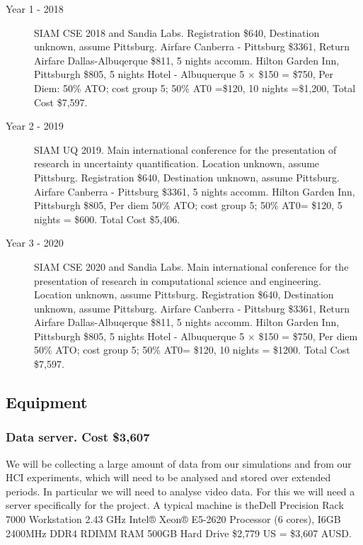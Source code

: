 \documentclass[a4paper,twoside,12pt,compact]{article}
\begin{document}
\begin{description}
\item[Year 1 - 2018] SIAM CSE 2018 and Sandia Labs.
Registration \$640, 
Destination unknown, assume Pittsburg.
Airfare Canberra - Pittsburg \$3361,
Return Airfare Dallas-Albuqerque \$811,
5 nights accomm. Hilton Garden Inn, Pittsburgh \$805,  
5 nights Hotel - Albuquerque 5 $\times$  \$150 = \$750,
Per Diem: 50\% ATO; cost group 5; 50\% AT0 =\$120, 10 nights =\$1,200, 
Total Cost \$7,597.

\item[Year 2 - 2019] SIAM UQ 2019.
Main international conference for the presentation of research in uncertainty quantification. Location unknown, assume Pittsburg.
Registration \$640,
Destination unknown, assume Pittsburg.
Airfare Canberra - Pittsburg \$3361,
5 nights accomm. Hilton Garden Inn, Pittsburgh \$805,  
Per diem 50\% ATO; cost group 5; 50\% AT0= \$120, 5 nights = \$600. 
Total Cost \$5,406.

\item[Year 3 - 2020]  SIAM CSE 2020 and Sandia Labs.
Main international conference for the presentation of research in computational science and engineering. Location unknown, assume Pittsburg.
Registration \$640,
Destination unknown, assume Pittsburg.
Airfare Canberra - Pittsburg \$3361,
Return Airfare Dallas-Albuqerque \$811,
5 nights accomm. Hilton Garden Inn, Pittsburgh \$805,  
5 nights Hotel - Albuquerque 5 $\times$  \$150 = \$750,
Per diem 50\% ATO; cost group 5; 50\% AT0= \$120, 10 nights = \$1200. 
Total Cost \$7,597.

\end{description}

\subsection*{Equipment}

\subsubsection*{Data server. Cost \$3,607}

We will be collecting a large amount of data from our simulations and from our HCI experiments, which will need to be analysed and stored over extended periods. In particular we will need to analyse video data.  For this we will need a server specifically for the project. A typical machine is theDell Precision Rack 7000 Workstation 2.43 GHz Intel® Xeon® E5-2620 Processor (6 cores), I6GB 2400MHz DDR4 RDIMM RAM 500GB  Hard Drive
\$2,779 US =  \$3,607 AUSD.
\end{document}
